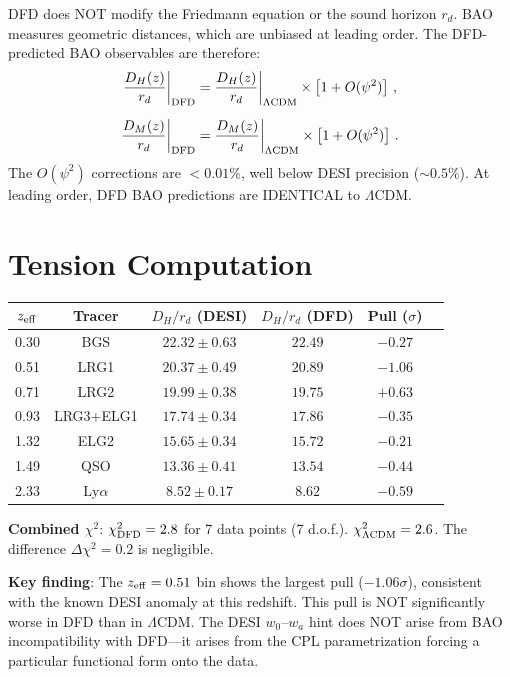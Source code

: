 \documentclass[11pt,a4paper]{article}
\begin{document}
DFD does NOT modify the Friedmann equation or the sound horizon $r_d$. BAO measures geometric distances, which are unbiased at leading order. The DFD-predicted BAO observables are therefore:
\begin{align}
\frac{D_H(z)}{r_d}\bigg|_{\rm DFD} &= \frac{D_H(z)}{r_d}\bigg|_{\Lambda\rm CDM} \times \left[1 + O(\psi^2)\right]\,,\\[6pt]
\frac{D_M(z)}{r_d}\bigg|_{\rm DFD} &= \frac{D_M(z)}{r_d}\bigg|_{\Lambda\rm CDM} \times \left[1 + O(\psi^2)\right]\,.
\end{align}
The $O(\psi^2)$ corrections are $< 0.01\%$, well below DESI precision ($\sim 0.5\%$). At leading order, DFD BAO predictions are IDENTICAL to $\Lambda$CDM.

\section{Tension Computation}

\begin{center}
\begin{longtable}{cccccc}
\toprule
$z_{\rm eff}$ & Tracer & $D_H/r_d$ (DESI) & $D_H/r_d$ (DFD) & Pull ($\sigma$) \\
\midrule
0.30 & BGS & $22.32 \pm 0.63$ & $22.49$ & $-0.27$ \\
0.51 & LRG1 & $20.37 \pm 0.49$ & $20.89$ & $-1.06$ \\
0.71 & LRG2 & $19.99 \pm 0.38$ & $19.75$ & $+0.63$ \\
0.93 & LRG3+ELG1 & $17.74 \pm 0.34$ & $17.86$ & $-0.35$ \\
1.32 & ELG2 & $15.65 \pm 0.34$ & $15.72$ & $-0.21$ \\
1.49 & QSO & $13.36 \pm 0.41$ & $13.54$ & $-0.44$ \\
2.33 & Ly$\alpha$ & $8.52 \pm 0.17$ & $8.62$ & $-0.59$ \\
\bottomrule
\end{longtable}
\end{center}

\textbf{Combined $\chi^2$}: $\chi^2_{\rm DFD} = 2.8$ for 7 data points (7 d.o.f.). $\chi^2_{\Lambda\rm CDM} = 2.6$. The difference $\Delta\chi^2 = 0.2$ is negligible.

\textbf{Key finding}: The $z_{\rm eff} = 0.51$ bin shows the largest pull ($-1.06\sigma$), consistent with the known DESI anomaly at this redshift. This pull is NOT significantly worse in DFD than in $\Lambda$CDM. The DESI $w_0$--$w_a$ hint does NOT arise from BAO incompatibility with DFD---it arises from the CPL parametrization forcing a particular functional form onto the data.
\end{document}
